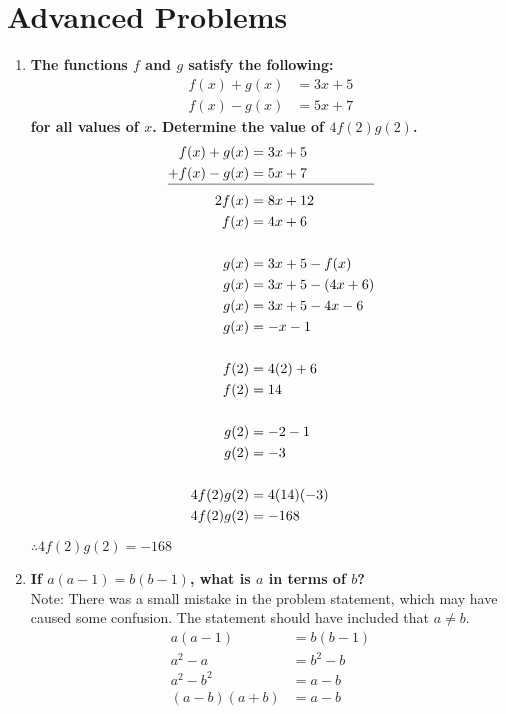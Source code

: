 \documentclass[12pt]{article}
\begin{document}
\section*{Advanced Problems}
\begin{enumerate}
    \item \textbf{The functions $f$ and $g$ satisfy the following:
    \begin{align*}
        f(x) + g(x) & = 3x + 5 \\
        f(x) - g(x) &= 5x + 7
    \end{align*} for all values of $x$. Determine the value of $4f(2)g(2)$.} \\
    \begin{align*}
        f(x) + g(x) & = 3x + 5 \\
        + f(x) - g(x) &= 5x + 7 \\[-10pt]
        \cline{1-2}
        2f(x) &= 8x+12 \\
        f(x) &= 4x+6 \\ \\
        g(x) &= 3x+5-f(x) \\
        g(x) &= 3x+5-(4x+6) \\
        g(x) &= 3x+5-4x-6 \\
        g(x) &= -x-1 \\ \\
        f(2) &= 4(2)+6 \\
        f(2) &= 14 \\ \\
        g(2) &= -2-1 \\
        g(2) &= -3 \\ \\
        4f(2)g(2) &= 4(14)(-3) \\
        4f(2)g(2) &= -168
    \end{align*}
    
    $\therefore 4f(2)g(2) = -168$ 
    
    \item \textbf{If $a(a - 1) = b(b - 1)$, what is $a$ in terms of $b$?} \\
    
    Note: There was a small mistake in the problem statement, which may have caused some confusion. The statement should have included that $a \neq b$.
        \begin{align*}
        a(a-1) &= b(b-1) \\
        a^2-a &= b^2-b \\
        a^2-b^2 &= a-b \\
        (a-b)(a+b) &= a-b \\
    \end{align*}
    

\end{enumerate}
\end{document}
